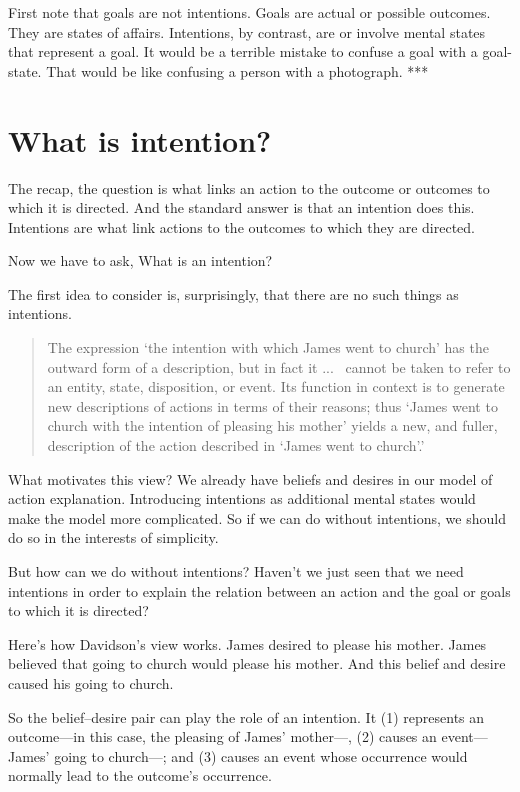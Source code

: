 \documentclass[12pt,\papersize]{extarticle}
\begin{document}
First note that goals are not intentions.
Goals are actual or possible outcomes.
They are states of affairs.
Intentions, by contrast, are or involve mental states that represent a goal.
It would be a terrible mistake to confuse a goal with a goal-state.
That would be like confusing a person with a photograph.
***


\section{What is intention?}
The recap, the question is what links an action to the outcome or outcomes to which it is directed.
And the standard answer is that an intention does this.
Intentions are what link  actions to the outcomes to which they are directed.

Now we have to ask, What is an intention?

The first idea to consider is, surprisingly, that there are no such things as intentions.
%
\begin{quote}
The expression `the intention with which James went to church' has the outward form of a description, but in fact it
...\ %
 cannot be taken to refer to an entity, state, disposition, or event. Its function in context is to generate new descriptions of actions in terms of their reasons; thus `James went to church with the intention of pleasing his mother' yields a new, and fuller, description of the action described in `James went to church'.' 
\citep[p.\ 690]{davidson:1963_orig}
\end{quote}
%
What motivates this view?
We already have beliefs and desires in our model of action explanation.
Introducing intentions as additional mental states would make the model more complicated.
So if we can do without intentions, we should do so in the interests of simplicity.

But how can we do without intentions?
Haven't we just seen that we need intentions in order to explain the relation between an action and the goal or goals to which it is directed?

Here's how Davidson's view works.
James desired to please his mother.
James believed that going to church would please his mother.
And this belief and desire caused his going to church.

So the belief--desire pair can play the role of an intention.  
It (1) represents an outcome---in this case, the pleasing of James' mother---, (2) causes an event---James' going to church---; and (3) causes an event whose occurrence would normally lead to the outcome’s occurrence.
\end{document}

